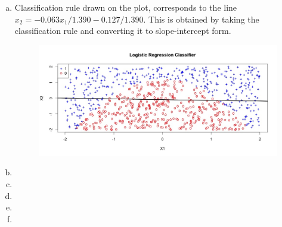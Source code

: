 \documentclass[12pt]{article}
\begin{document}
\begin{enumerate}[(a)]
\item Classification rule drawn on the plot, corresponds to the line $x_2 = -0.063 x_1 / 1.390  - 0.127 / 1.390$. This is obtained by taking the classification rule and converting it to slope-intercept form.
\begin{figure}[H]
\includegraphics[scale=.4]{y1_plot2.jpeg}
\end{figure}

\item 
\item 
\item 
\item 
\item 
\end{enumerate}
\end{document}
